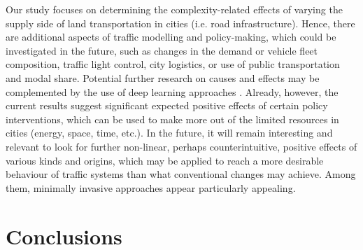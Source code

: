 Our study focuses on determining the complexity-related effects of varying the supply side of land transportation in cities (i.e. road infrastructure). Hence, there are additional aspects of traffic modelling and policy-making, which could be investigated in the future, such as changes in the demand or vehicle fleet composition, traffic light control, city logistics, or use of public transportation and modal share. Potential further research on causes and effects may be complemented by the use of deep learning approaches \citep{Mirzahossein2022,Zargari2022}. Already, however, the current results suggest significant expected positive effects of certain policy interventions, which can be used to make more out of the limited resources in cities (energy, space, time, etc.). In the future, it will remain interesting and relevant to look for further non-linear, perhaps counterintuitive, positive effects of various kinds and origins, which may be applied to reach a more desirable behaviour of traffic systems than what conventional changes may achieve. Among them, minimally invasive approaches appear particularly appealing.

\section{Conclusions}

